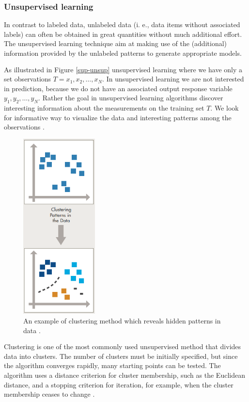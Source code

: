 \subsubsection{Unsupervised learning}

In contrast to labeled data, unlabeled data (i. e., data items without associated labels) can often be obtained in great quantities without much additional effort. The unsupervised learning technique aim at making use of the (additional) information provided by the unlabeled patterns to generate appropriate models. 

As illustrated in Figure \ref{sup-unsup} unsupervised learning where we have only a set observations $T=x_1,x_2,\dots, x_N$. In unsupervised learning we are not interested in prediction, because we do not have an associated output response variable $y_1,y_2,\dots, y_N$. Rather the goal in unsupervised learning algorithms discover interesting information about the measurements on the training set $T$. We look for informative way to visualize the data and interesting patterns among the observations \citep{james2013introduction}. 

\begin{figure}[H]
  \centering
    \includegraphics[width=0.35\textwidth]{images/cluster.png}
    \caption{An example of clustering method which reveals hidden patterns in data \citep{Machinelearning}.}
  \label{datagrowth.png}
\end{figure}

Clustering is one of the most commonly used unsupervised method that divides data into clusters. The number of clusters must be initially specified, but since the algorithm converges rapidly, many starting points can be tested. The algorithm uses a distance
criterion for cluster membership, such as the Euclidean distance, and a stopping criterion for iteration, for example, when the cluster membership ceases to change \citep{ball2010data}.

